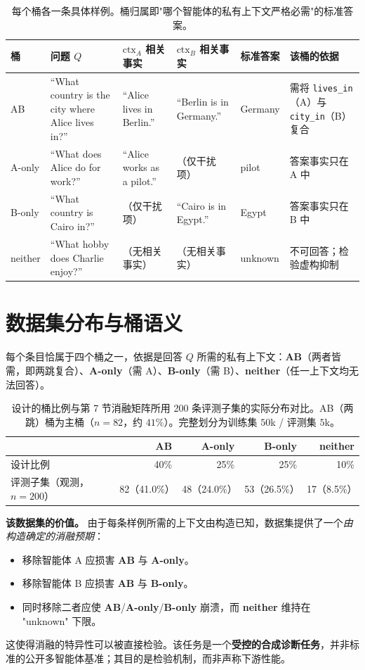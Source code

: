 \documentclass[10pt]{article}
\newcommand{\ctxa}{$\text{ctx}_A$}
\newcommand{\ctxb}{$\text{ctx}_B$}
\begin{document}
\begin{table}[H]
\centering
\footnotesize
\begin{tabular}{@{}p{0.9cm} p{3.0cm} p{2.6cm} p{2.6cm} p{1.1cm} p{3.3cm}@{}}
\toprule
\textbf{桶} & \textbf{问题 $Q$} & \textbf{\ctxa{} 相关事实} & \textbf{\ctxb{} 相关事实} & \textbf{标准答案} & \textbf{该桶的依据} \\
\midrule
AB        & ``What country is the city where Alice lives in?'' & ``Alice lives in Berlin.'' & ``Berlin is in Germany.'' & Germany & 需将 \texttt{lives\_in}（A）与 \texttt{city\_in}（B）复合 \\
A-only    & ``What does Alice do for work?'' & ``Alice works as a pilot.'' & （仅干扰项） & pilot & 答案事实只在 A 中 \\
B-only    & ``What country is Cairo in?'' & （仅干扰项） & ``Cairo is in Egypt.'' & Egypt & 答案事实只在 B 中 \\
neither   & ``What hobby does Charlie enjoy?'' & （无相关事实） & （无相关事实） & unknown & 不可回答；检验虚构抑制 \\
\bottomrule
\end{tabular}
\caption{每个桶各一条具体样例。桶归属即"哪个智能体的私有上下文严格必需"的标准答案。}
\end{table}

\section{数据集分布与桶语义}
每个条目恰属于四个桶之一，依据是回答 $Q$ 所需的私有上下文：\textbf{AB}（两者皆需，即两跳复合）、\textbf{A-only}（需 A）、\textbf{B-only}（需 B）、\textbf{neither}（任一上下文均无法回答）。

\begin{table}[H]
\centering
\small
\begin{tabular}{@{}l r r r r@{}}
\toprule
 & \textbf{AB} & \textbf{A-only} & \textbf{B-only} & \textbf{neither} \\
\midrule
设计比例                       & 40\% & 25\%   & 25\%   & 10\%  \\
评测子集（观测，$n{=}200$）    & 82（41.0\%） & 48（24.0\%） & 53（26.5\%） & 17（8.5\%） \\
\bottomrule
\end{tabular}
\caption{设计的桶比例与第 7 节消融矩阵所用 200 条评测子集的实际分布对比。AB（两跳）桶为主桶（$n{=}82$，约 $41\%$）。完整划分为训练集 $50$k / 评测集 $5$k。}
\end{table}

\noindent\textbf{该数据集的价值。} 由于每条样例所需的上下文由构造已知，数据集提供了一个\emph{由构造确定的消融预期}：
\begin{itemize}
\item 移除智能体 A 应损害 \textbf{AB} 与 \textbf{A-only}。
\item 移除智能体 B 应损害 \textbf{AB} 与 \textbf{B-only}。
\item 同时移除二者应使 \textbf{AB}/\textbf{A-only}/\textbf{B-only} 崩溃，而 \textbf{neither} 维持在 "unknown" 下限。
\end{itemize}
这使得消融的特异性可以被直接检验。该任务是一个\textbf{受控的合成诊断任务}，并非标准的公开多智能体基准；其目的是检验机制，而非声称下游性能。
\end{document}
